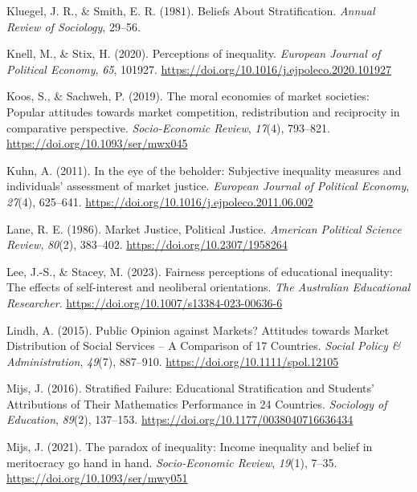 \documentclass[
  12pt,
]{article}
\newlength{\cslhangindent}
\newenvironment{CSLReferences}[2] %
 {\begin{list}{}{%
  \setlength{\itemindent}{0pt}
  \setlength{\leftmargin}{0pt}
  \setlength{\parsep}{0pt}
  \ifodd #1
   \setlength{\leftmargin}{\cslhangindent}
   \setlength{\itemindent}{-1\cslhangindent}
  \fi
  \setlength{\itemsep}{#2\baselineskip}}}
 {\end{list}}
\begin{document}
\begin{CSLReferences}{1}{0}
Kluegel, J. R., \& Smith, E. R. (1981). Beliefs {About Stratification}.
\emph{Annual Review of Sociology}, 29--56.

Knell, M., \& Stix, H. (2020). Perceptions of inequality. \emph{European
Journal of Political Economy}, \emph{65}, 101927.
\url{https://doi.org/10.1016/j.ejpoleco.2020.101927}

Koos, S., \& Sachweh, P. (2019). The moral economies of market
societies: Popular attitudes towards market competition, redistribution
and reciprocity in comparative perspective. \emph{Socio-Economic
Review}, \emph{17}(4), 793--821.
\url{https://doi.org/10.1093/ser/mwx045}

Kuhn, A. (2011). In the eye of the beholder: {Subjective} inequality
measures and individuals' assessment of market justice. \emph{European
Journal of Political Economy}, \emph{27}(4), 625--641.
\url{https://doi.org/10.1016/j.ejpoleco.2011.06.002}

Lane, R. E. (1986). Market {Justice}, {Political Justice}.
\emph{American Political Science Review}, \emph{80}(2), 383--402.
\url{https://doi.org/10.2307/1958264}

Lee, J.-S., \& Stacey, M. (2023). Fairness perceptions of educational
inequality: The effects of self-interest and neoliberal orientations.
\emph{The Australian Educational Researcher}.
\url{https://doi.org/10.1007/s13384-023-00636-6}

Lindh, A. (2015). Public {Opinion} against {Markets}? {Attitudes}
towards {Market Distribution} of {Social Services} -- {A Comparison} of
17 {Countries}. \emph{Social Policy \& Administration}, \emph{49}(7),
887--910. \url{https://doi.org/10.1111/spol.12105}

Mijs, J. (2016). Stratified {Failure}: {Educational Stratification} and
{Students}' {Attributions} of {Their Mathematics Performance} in 24
{Countries}. \emph{Sociology of Education}, \emph{89}(2), 137--153.
\url{https://doi.org/10.1177/0038040716636434}

Mijs, J. (2021). The paradox of inequality: Income inequality and belief
in meritocracy go hand in hand. \emph{Socio-Economic Review},
\emph{19}(1), 7--35. \url{https://doi.org/10.1093/ser/mwy051}


\end{CSLReferences}
\end{document}
